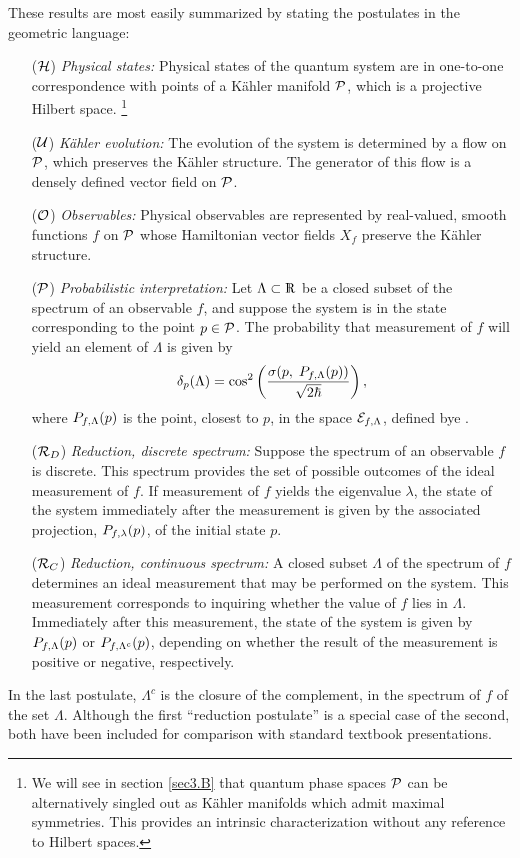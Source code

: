 These results are most easily summarized by stating the postulates in
the geometric language:
%
\begin{itemize}
\item[(${\cal H}$)] {\it Physical states: } Physical states of the
quantum system are in one-to-one correspondence with points of a
K\"ahler manifold ${\cal P}$, which is a projective Hilbert space.%
%
\footnote{We will see in section \ref{sec3.B} that quantum phase
spaces $\P$ can be alternatively singled out as K\"ahler manifolds
which admit maximal symmetries.  This provides an intrinsic
characterization without any reference to Hilbert spaces.}
%
\item[(${\cal U}$)] {\it K\"ahler evolution: } The evolution of the
system is determined by a flow on $\P$, which preserves the K\"ahler
structure. The generator of this flow is a densely defined vector
field on $\P$.
%
\item[(${\cal O}$)] {\it Observables: } Physical observables are
represented by real-valued, smooth functions $f$ on $\P$ whose
Hamiltonian vector fields $X_f$ preserve the K\"ahler structure.
%
\item[(${\cal P}$)] {\it Probabilistic interpretation: } Let $\Lambda
\subset \R$ be a closed subset of the spectrum of an observable $f$,
and suppose the system is in the state corresponding to the point $p
\in \P$.  The probability that measurement of $f$ will yield an
element of $\Lambda$ is given by
%
\begin{equation}
\delta_p(\Lambda) = \cos^2\left(\frac {\sigma(p, \;{\Bbb P}_{f,\Lambda}
(p))} {\sqrt{2\hbar}} \right),
\end{equation}
%	
where ${\Bbb P}_{f,\Lambda}(p)$ is the point, closest to $p$, in the
space ${\cal E}_{f, \Lambda}$, defined bye .
%
\item[(${\cal R}_D$)] {\it Reduction, discrete spectrum: } Suppose the
spectrum of an observable $f$ is discrete.  This spectrum provides the
set of possible outcomes of the ideal measurement of $f$.  If
measurement of $f$ yields the eigenvalue $\lambda$, the state of the
system immediately after the measurement is given by the associated
projection, ${\Bbb P}_{f,\lambda}(p)$, of the initial state $p$.
%
\item[(${\cal R}_C$)] {\it Reduction, continuous spectrum: } A closed
subset $\Lambda$ of the spectrum of $f$ determines an ideal
measurement that may be performed on the system.  This measurement
corresponds to inquiring whether the value of $f$ lies in $\Lambda$.
Immediately after this measurement, the state of the system is given
by ${\Bbb P}_{f,\Lambda}(p)$ or ${\Bbb P}_{f,\Lambda^c}(p)$, depending
on whether the result of the measurement is positive or negative,
respectively.
\end{itemize}
%
In the last postulate, $\Lambda^c$ is the closure of the complement,
in the spectrum of $f$ of the set $\Lambda$.  Although the first
``reduction postulate''  is a special case of the second, both have
been included for comparison with standard textbook presentations.

